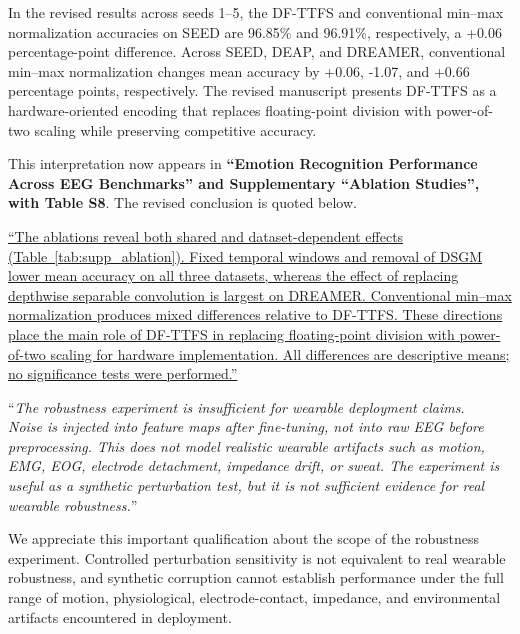 \documentclass[12pt,technote,onecolumn]{IEEEtran}
\begin{document}
In the revised results across seeds 1--5, the DF-TTFS and conventional
min--max normalization accuracies on SEED are 96.85\% and 96.91\%,
respectively, a +0.06 percentage-point difference. Across SEED, DEAP, and DREAMER,
conventional min--max normalization changes mean accuracy by +0.06,
-1.07, and +0.66 percentage points, respectively. The revised manuscript
presents DF-TTFS as a hardware-oriented encoding that replaces
floating-point division with power-of-two scaling while preserving
competitive accuracy.



This interpretation now appears in \textbf{``Emotion Recognition Performance Across EEG Benchmarks'' and Supplementary ``Ablation Studies'', with Table S8}. The revised conclusion is quoted below.

\uline{``The ablations reveal both shared and dataset-dependent effects (Table~\ref{tab:supp_ablation}). Fixed temporal windows and removal of DSGM lower mean accuracy on all three datasets, whereas the effect of replacing depthwise separable convolution is largest on DREAMER. Conventional min--max normalization produces mixed differences relative to DF-TTFS. These directions place the main role of DF-TTFS in replacing floating-point division with power-of-two scaling for hardware implementation. All differences are descriptive means; no significance tests were performed.''}

\EvidenceSuppTableSEight

\vspace{4mm}

``{\it The robustness experiment is insufficient for wearable deployment
claims.\\
Noise is injected into feature maps after fine-tuning, not into raw EEG
before preprocessing. This does not model realistic wearable artifacts
such as motion, EMG, EOG, electrode detachment, impedance drift, or
sweat. The experiment is useful as a synthetic perturbation test, but it
is not sufficient evidence for real wearable robustness.}''
\vspace{1mm}


We appreciate this important qualification about the scope of the robustness experiment. Controlled perturbation sensitivity is not equivalent to real wearable robustness, and synthetic corruption cannot establish performance under the full range of motion, physiological, electrode-contact, impedance, and environmental artifacts encountered in deployment.
\end{document}
